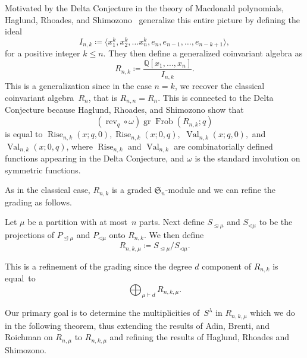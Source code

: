 \documentclass[ALCO,ThmDefs,Unicode,epreuves]{cedram}
\DeclareMathOperator{\Frob}{Frob}
\DeclareMathOperator{\gr}{gr}
\DeclareMathOperator{\Rise}{Rise}
\DeclareMathOperator{\Val}{Val}
\DeclareMathOperator{\rev}{rev}
\begin{document}
	Motivated by the Delta Conjecture in the theory of Macdonald polynomials, Haglund, Rhoades, and Shimozono~\cite{HRS} 
generalize this entire picture by defining the ideal 
\begin{equation}
I_{n,k}\coloneqq \langle x_1^k,x_2^k,\ldots x_n^k, e_{n},e_{n-1},\ldots, e_{n-k+1}\rangle,
\end{equation}
for a positive integer $k\leq n$. They then define a generalized coinvariant algebra as 
\begin{equation}
R_{n,k}\coloneqq \frac{\mathbb{Q}[x_1,\ldots, x_n]}{I_{n,k}}.
\end{equation}
 This is a generalization since in the case $n=k$, we recover the classical coinvariant algebra~$R_n$, that is 
$R_{n,n}=R_n$. This is connected to the Delta Conjecture because Haglund, Rhoades, and Shimozono show that 
\begin{equation}
(\rev_q\mathrel{\circ} \omega)\gr\Frob (R_{n,k};q)
\end{equation} 
is equal to $\Rise _{n,k}(x;q,0),\Rise _{n,k}(x;0,q),$ 
$\Val _{n,k}(x;q,0),$ and $\Val _{n,k}(x;0,q)$, where $\Rise _{n,k}$ and $\Val _{n,k}$ are 
combinatorially defined functions appearing in the Delta Conjecture, and $\omega$ is the standard involution on symmetric 
functions.

	As in the classical case, $R_{n,k}$ is a graded $\mathfrak{S}_n$-module and we can refine the grading as follows.

	\begin{defi}
	Let $\mu$ be a partition with at most~$n$ parts. Next define $S_{\trianglelefteq\mu}$ and $S_{\triangleleft\mu}$ to be 
the projections of $P_{\trianglelefteq\mu}$ and $P_{\triangleleft\mu}$ onto $R_{n,k}$. We then define 
		\begin{equation}
R_{n,k,\mu}\coloneqq S_{\trianglelefteq\mu}/S_{\triangleleft\mu}.
\end{equation}
	\end{defi}
	This is a refinement of the grading since the degree $d$ component of $R_{n,k}$ is equal~to 
\begin{equation}
\bigoplus_{\mu\vdash d} R_{n,k,\mu}.
\end{equation}


Our primary goal is to determine the multiplicities of~$S^\lambda$ in $R_{n,k,\mu}$ which we do in the following theorem, thus 
extending the results of Adin, Brenti, and Roichman on $R_{n,\mu}$ to $R_{n,k,\mu}$ and refining the results of Haglund, 
Rhoades and Shimozono.
\end{document}

